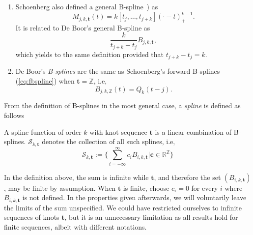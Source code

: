 \begin{remark}
  \begin{enumerate}
    \item Schoenberg also defined a general B-spline~\cite[Lecture 1, (2.1)]{schoenberg_cardinal_1973-1}) as
    \begin{equation*}
      M_{j,k,\bm{t}}(t) = k[t_j, \ldots, t_{j+k}]{(\cdot-t)}_+^{k-1}.
    \end{equation*}
    It is related to De Boor's general B-spline as
    \begin{equation*}
      \frac{k}{t_{j+k}-t_j}B_{j,k,\bm{t}},
    \end{equation*}
    which yields to the same definition provided that $t_{j+k} - t_j = k$.
  \item De Boor's \emph{B-splines} are the same as Schoenberg's forward B-splines (\ref{eq:fbspline})  when
    $\bm{t} = \mathbb{Z}$, i.e,
    \begin{equation*}
      B_{j,k,\mathbb{Z}}(t) = Q_k(t-j).
    \end{equation*}
  \end{enumerate}
\end{remark}

From the definition of B-splines in the most general case, a \emph{spline} is defined as follows
\begin{deftn}\label{def:gen-splines}
  A spline function of order $k$ with knot sequence $\bm{t}$ is a linear combination of B-splines. $\mathscr{S}_{k, 
  \bm{t}}$ denotes the collection of all such splines, i.e,
  \begin{equation*}
    \mathscr{S}_{k, \bm{t}} := \{ \sum_{i=-\infty}^{\infty} c_i B_{i,k,\bm{t}} | \bm{c} \in \mathbb{R}^{\mathbb{Z}}\}
  \end{equation*}
\end{deftn}

\begin{remark}
  In the definition above, the sum is infinite while $\bm{t}$, and therefore the set $(B_{i, k,\bm{t}})$, may be finite 
  by assumption. When $\bm{t}$ is finite, choose $c_i=0$ for every $i$ where $B_{i,k,\bm{t}}$ is not defined. In the 
  properties given afterwards, we will voluntarily leave the limits of the sum unspecified. We could have restricted 
  ourselves to infinite sequences of knots $\bm{t}$, but it is an unnecessary limitation as all results hold for finite 
  sequences, albeit with different notations.
\end{remark}

